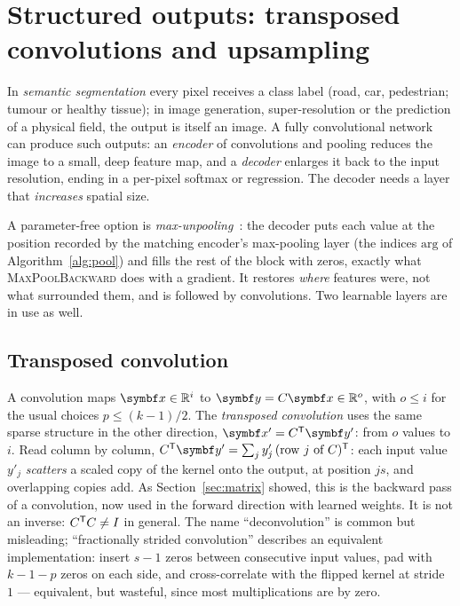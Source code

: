 \documentclass[11pt]{article}
\newcommand{\y}{\vect{y}}
\begin{document}
\section{Structured outputs: transposed convolutions and upsampling}\label{sec:transposed}

In \emph{semantic segmentation} every pixel receives a class label (road, car, pedestrian; tumour or healthy tissue); in
image generation, super-resolution or the prediction of a physical field, the output is itself an image. A fully
convolutional network~\cite{long2015} can produce such outputs: an \emph{encoder} of convolutions and pooling reduces the
image to a small, deep feature map, and a \emph{decoder} enlarges it back to the input resolution, ending in a per-pixel
softmax or regression. The decoder needs a layer that \emph{increases} spatial size.

A parameter-free option is \emph{max-unpooling}~\cite{zeiler2014}: the decoder puts each value at the position recorded
by the matching encoder's max-pooling layer (the indices $\mathrm{arg}$ of Algorithm~\ref{alg:pool}) and fills the rest of
the block with zeros, exactly what \textsc{MaxPoolBackward} does with a gradient. It restores \emph{where} features
were, not what surrounded them, and is followed by convolutions. Two learnable layers are in use as well.

\subsection{Transposed convolution}

A convolution maps $\x \in \R^i$ to $\y = C\x \in \R^o$, with $o \le i$ for the usual choices $p \le (k - 1)/2$. The
\emph{transposed convolution} uses the same sparse structure in the other direction, $\x' = C\T\y'$: from $o$ values to $i$.
Read column by column, $C\T\y' = \sum_j y'_j\,(\text{row } j \text{ of } C)\T$: each input value $y'_j$ \emph{scatters} a
scaled copy of the kernel onto the output, at position $js$, and overlapping copies add. As Section~\ref{sec:matrix}
showed, this is the backward pass of a convolution, now used in the forward direction with learned weights. It is not an
inverse: $C^{\mathsf{T}} C \ne I$ in general. The name ``deconvolution'' is common but misleading; ``fractionally strided
convolution'' describes an equivalent implementation: insert $s - 1$ zeros between consecutive input values, pad with
$k - 1 - p$ zeros on each side, and cross-correlate with the flipped kernel at stride $1$ --- equivalent, but wasteful,
since most multiplications are by zero.
\end{document}
